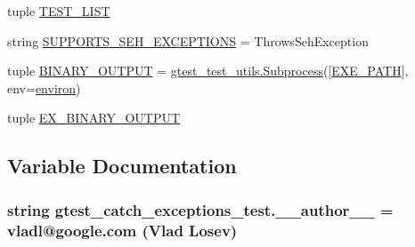 \begin{DoxyCompactItemize}
tuple \hyperlink{namespacegtest__catch__exceptions__test_a47d343e41ab21971800091c7166f6129}{T\+E\+S\+T\+\_\+\+L\+I\+S\+T}
\item 
string \hyperlink{namespacegtest__catch__exceptions__test_a237f68d721da53e9fd4f83b07a1887e3}{S\+U\+P\+P\+O\+R\+T\+S\+\_\+\+S\+E\+H\+\_\+\+E\+X\+C\+E\+P\+T\+I\+O\+N\+S} = \textquotesingle{}Throws\+Seh\+Exception\textquotesingle{}
\item 
tuple \hyperlink{namespacegtest__catch__exceptions__test_a0116f4bc5b12d5f2edf7f0aa5ebdd121}{B\+I\+N\+A\+R\+Y\+\_\+\+O\+U\+T\+P\+U\+T} = \hyperlink{classgtest__test__utils_1_1_subprocess}{gtest\+\_\+test\+\_\+utils.\+Subprocess}(\mbox{[}\hyperlink{namespacegtest__catch__exceptions__test_a9176972ff83182f11532cbbc27f5cb42}{E\+X\+E\+\_\+\+P\+A\+T\+H}\mbox{]}, env=\hyperlink{namespacegtest__catch__exceptions__test_ae51b794c28e667016c180f1b3fc85292}{environ})
\item 
tuple \hyperlink{namespacegtest__catch__exceptions__test_a890b7d8de84d44cf4cd776663654489a}{E\+X\+\_\+\+B\+I\+N\+A\+R\+Y\+\_\+\+O\+U\+T\+P\+U\+T}
\end{DoxyCompactItemize}


\subsection{Variable Documentation}
\hypertarget{namespacegtest__catch__exceptions__test_a26e1831a55209b037dc7d8d3ca1e4f32}{}
\subsubsection[{\+\_\+\+\_\+author\+\_\+\+\_\+}]{\setlength{\rightskip}{0pt plus 5cm}string gtest\+\_\+catch\+\_\+exceptions\+\_\+test.\+\_\+\+\_\+author\+\_\+\+\_\+ = \textquotesingle{}vladl@google.\+com (Vlad Losev)\textquotesingle{}}\label{namespacegtest__catch__exceptions__test_a26e1831a55209b037dc7d8d3ca1e4f32}
\hypertarget{namespacegtest__catch__exceptions__test_a0116f4bc5b12d5f2edf7f0aa5ebdd121}{}
